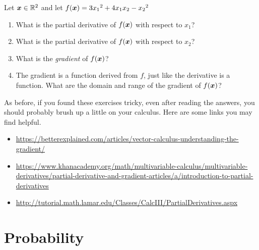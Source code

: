 \documentclass[11pt]{article}
\begin{document}
\begin{Exercise}
\noindent Let ${\bm x} \in {\mathbb R}^2$ and let $f({\bm x}) = 3 {x_1}^2 + 4 x_1x_2 - {x_2}^2$
\begin{enumerate}
\item What is the partial derivative of $f({\bm x})$ with respect to $x_1$? \ans{\[\frac{\partial\left ( 3 {x_1}^2 + 4 x_1x_2 - {x_2}^2\right ) }{\partial x} = \frac{\partial 3{x_1}^2}{\partial x_1} + \frac{\partial 4 x_1x_2 }{\partial x_1} + \frac{\partial 4 {x_2}^2}{\partial x_1}  = 6x_1 + 4x_2 \]}{}
\item What is the partial derivative of $f({\bm x})$ with respect to $x_2$? \ans{\[\frac{\partial 3{x_1}^2}{\partial x_2} + \frac{\partial 4 x_1x_2 }{\partial x_2} + \frac{\partial 4 {x_2}^2}{\partial x_2} = 4x_1 - 2x_2 \]}{}
\item What is the \emph{gradient} of $f({\bm x})$? 
\item The gradient is a function derived from $f$, just like the derivative is a function. What are the domain and range of the gradient of $f({\bm x})$?	 
\end{enumerate}
\end{Exercise}

\noindent As before, if you found these exercises tricky, even after reading the answers, you should probably brush up a little on your calculus. Here are some links you may find helpful.
\begin{itemize}
\item \url{https://betterexplained.com/articles/vector-calculus-understanding-the-gradient/}
\item \url{https://www.khanacademy.org/math/multivariable-calculus/multivariable-derivatives/partial-derivative-and-gradient-articles/a/introduction-to-partial-derivatives}
\item \url{http://tutorial.math.lamar.edu/Classes/CalcIII/PartialDerivatives.aspx}
\end{itemize}

\section{Probability}
\end{document}
